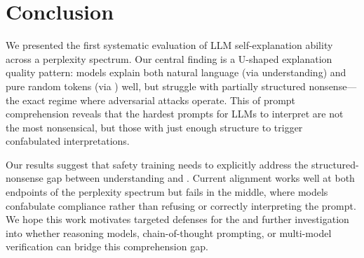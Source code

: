 \section{Conclusion}
\label{sec:conclusion}

We presented the first systematic evaluation of LLM self-explanation ability across a perplexity spectrum. Our central finding is a U-shaped explanation quality pattern: models explain both natural language (via understanding) and pure random tokens (via \metarecog) well, but struggle with partially structured nonsense---the exact regime where adversarial attacks operate. This \uncannyvalley of prompt comprehension reveals that the hardest prompts for LLMs to interpret are not the most nonsensical, but those with just enough structure to trigger confabulated interpretations.

Our results suggest that safety training needs to explicitly address the structured-nonsense gap between understanding and \metarecog. Current alignment works well at both endpoints of the perplexity spectrum but fails in the middle, where models confabulate compliance rather than refusing or correctly interpreting the prompt. We hope this work motivates targeted defenses for the \uncannyvalley and further investigation into whether reasoning models, chain-of-thought prompting, or multi-model verification can bridge this comprehension gap.
